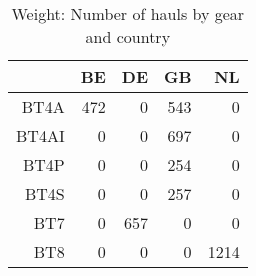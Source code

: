 \begin{table}[ht]
\centering
\begin{tabular}{rrrrr}
  \hline
 & BE & DE & GB & NL \\ 
  \hline
BT4A & 472 & 0 & 543 & 0 \\ 
  BT4AI & 0 & 0 & 697 & 0 \\ 
  BT4P & 0 & 0 & 254 & 0 \\ 
  BT4S & 0 & 0 & 257 & 0 \\ 
  BT7 & 0 & 657 & 0 & 0 \\ 
  BT8 & 0 & 0 & 0 & 1214 \\ 
   \hline
\end{tabular}
\caption{Weight: Number of hauls by gear and country} 
\end{table}
